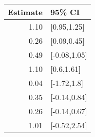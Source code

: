 \begin{tabular}{rl}
  \hline
Estimate & 95\% CI \\ 
  \hline
1.10 & [0.95,1.25] \\ 
  0.26 & [0.09,0.45] \\ 
  0.49 & [-0.08,1.05] \\ 
  1.10 & [0.6,1.61] \\ 
  0.04 & [-1.72,1.8] \\ 
  0.35 & [-0.14,0.84] \\ 
  0.26 & [-0.14,0.67] \\ 
  1.01 & [-0.52,2.54] \\ 
   \hline
\end{tabular}

